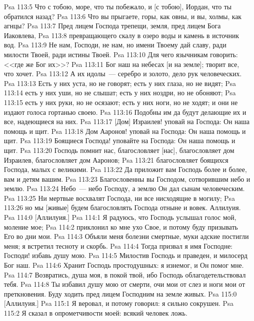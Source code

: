 \vs Psa 113:5 Что с тобою, море, что ты побежало, и [с тобою], Иордан, что ты обратился назад?
\vs Psa 113:6 Что вы прыгаете, горы, как овны, и вы, холмы, как агнцы?
\vs Psa 113:7 Пред лицем Господа трепещи, земля, пред лицем Бога Иаковлева,
\vs Psa 113:8 превращающего скалу в озеро воды и камень в источник вод.
\vs Psa 113:9 Не нам, Господи, не нам, но имени Твоему дай славу, ради милости Твоей, ради истины Твоей.
\vs Psa 113:10 Для чего язычникам говорить: <<где же Бог их>>?
\vs Psa 113:11 Бог наш на небесах [и на земле]; творит все, что хочет.
\vs Psa 113:12 А их идолы~--- серебро и золото, дело рук человеческих.
\vs Psa 113:13 Есть у них уста, но не говорят; есть у них глаза, но не видят;
\vs Psa 113:14 есть у них уши, но не слышат; есть у них ноздри, но не обоняют;
\vs Psa 113:15 есть у них руки, но не осязают; есть у них ноги, но не ходят; и они не издают голоса гортанью своею.
\vs Psa 113:16 Подобны им да будут делающие их и все, надеющиеся на них.
\vs Psa 113:17 [Дом] Израилев! уповай на Господа: Он наша помощь и щит.
\vs Psa 113:18 Дом Ааронов! уповай на Господа: Он наша помощь и щит.
\vs Psa 113:19 Боящиеся Господа! уповайте на Господа: Он наша помощь и щит.
\vs Psa 113:20 Господь помнит нас, благословляет [нас], благословляет дом Израилев, благословляет дом Ааронов;
\vs Psa 113:21 благословляет боящихся Господа, малых с великими.
\vs Psa 113:22 Да приложит вам Господь более и более, вам и детям вашим.
\vs Psa 113:23 Благословенны вы Господом, сотворившим небо и землю.
\vs Psa 113:24 Небо~--- небо Господу, а землю Он дал сынам человеческим.
\vs Psa 113:25 Ни мертвые восхвалят Господа, ни все нисходящие в могилу;
\vs Psa 113:26 но мы [живые] будем благословлять Господа отныне и вовек. Аллилуия.
\vs Psa 114:0 [Аллилуия.]
\rsbpar\vs Psa 114:1 Я радуюсь, что Господь услышал голос мой, моление мое;
\vs Psa 114:2 приклонил ко мне ухо Свое, и потому буду призывать Его во  дни мои.
\vs Psa 114:3 Объяли меня болезни смертные, муки адские постигли меня; я встретил тесноту и скорбь.
\vs Psa 114:4 Тогда призвал я имя Господне: Господи! избавь душу мою.
\vs Psa 114:5 Милостив Господь и праведен, и милосерд Бог наш.
\vs Psa 114:6 Хранит Господь простодушных: я изнемог, и Он помог мне.
\vs Psa 114:7 Возвратись, душа моя, в покой твой, ибо Господь облагодетельствовал тебя.
\vs Psa 114:8 Ты избавил душу мою от смерти, очи мои от слез и ноги мои от преткновения. Буду ходить пред лицем Господним на земле живых.
\vs Psa 115:0 [Аллилуия.]
\rsbpar\vs Psa 115:1 Я веровал, и потому говорил: я сильно сокрушен.
\vs Psa 115:2 Я сказал в опрометчивости моей: всякий человек ложь.
